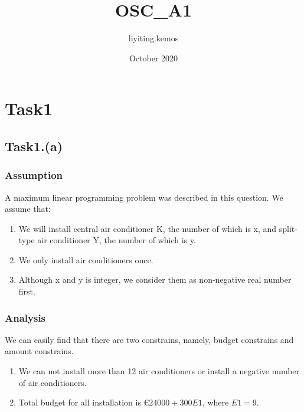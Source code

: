 \documentclass{article}
\title{OSC_A1}
\author{liyiting.kemos }
\date{October 2020}
\begin{document}
\section{Task1}
    \subsection{Task1.(a)}
        \subsubsection{Assumption}
            A maximum linear programming problem was described in this question. We assume that:\\
            \begin{enumerate}
                \item We will install central air conditioner K, the number of which is x, and split-type air conditioner Y, the number of which is y. 
                \item We only install air conditioners once.
                \item Although x and y is integer, we consider them as non-negative real number first.
            \end{enumerate}
    
        \subsubsection{Analysis}
            We can easily find that there are two constrains, namely, budget constrains and amount constrains. \\
            \begin{enumerate}
                \item We can not install more than 12 air conditioners or install a negative number of air conditioners. 
                \item Total budget for all installation is \euro $24000 + 300E1$, where $E1 = 9$.
            \end{enumerate}
            
\end{document}
